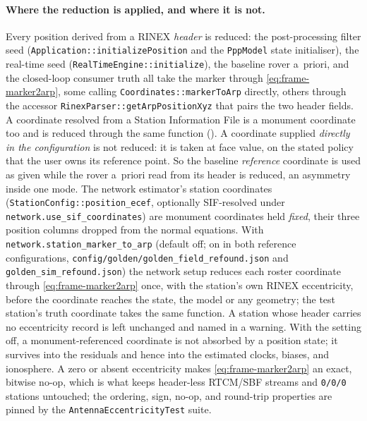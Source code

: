 \documentclass[main.tex]{subfiles}
\begin{document}
\paragraph{Where the reduction is applied, and where it is not.}
Every position derived from a RINEX \emph{header} is reduced: the
post-processing filter seed (\texttt{Application::initializePosition}
and the \texttt{PppModel} state initialiser), the real-time seed
(\texttt{RealTimeEngine::initialize}), the baseline rover a~priori, and
the closed-loop consumer truth all take the marker through
\eqref{eq:frame-marker2arp}, some calling
\texttt{Coordinates::markerToArp} directly, others through the accessor
\texttt{RinexParser::getArpPositionXyz} that pairs the two header
fields.  A coordinate resolved from a Station Information File is a
monument coordinate too and is reduced through the same function
().
A coordinate supplied
\emph{directly in the configuration} is not reduced: it is taken at face
value, on the stated policy that the user owns its reference point.  So
the baseline \emph{reference} coordinate is used as given while the
rover a~priori read from its header is reduced, an asymmetry inside
one mode.  The network estimator's station coordinates
(\texttt{StationConfig::position\_ecef}, optionally
SIF-resolved under \texttt{network.use\_sif\_coordinates}) are monument
coordinates held \emph{fixed}, their three position columns
dropped from the normal equations.  With
\texttt{network.station\_marker\_to\_arp} (default off; on in both
reference configurations, \texttt{config/golden/golden\_field\_refound.json}
and \texttt{golden\_sim\_refound.json}) the network setup
reduces each roster coordinate through \eqref{eq:frame-marker2arp} once,
with the station's own RINEX eccentricity, before the coordinate reaches
the state, the model or any geometry; the test station's truth
coordinate takes the same function.  A station whose header carries no
eccentricity record is left unchanged and named in a warning.  With the
setting off, a monument-referenced coordinate is not absorbed by a
position state; it survives into the residuals and hence into the
estimated clocks, biases, and ionosphere.  A zero or absent eccentricity
makes \eqref{eq:frame-marker2arp} an exact, bitwise no-op, which is what
keeps header-less RTCM/SBF streams and \texttt{0/0/0} stations
untouched; the ordering, sign, no-op, and round-trip properties are
pinned by the \texttt{AntennaEccentricityTest} suite.

\end{document}
